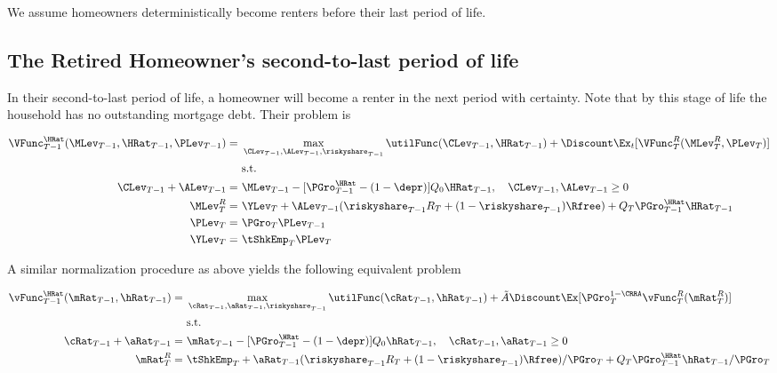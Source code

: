 \documentclass[PortfolioChoiceWithRiskyHousing]{subfiles}
\begin{document}
We assume homeowners deterministically become renters before their last period of life.

\subsection{The Retired Homeowner's second-to-last period of life}

In their second-to-last period of life, a homeowner will become a renter in the next period with certainty. Note that by this stage of life the household has no outstanding mortgage debt. Their problem is

\begin{equation}
	\begin{split}
		\VFunc_{T-1}^{\HRat}(\MLev_{T-1}, \HRat_{T-1}, \PLev_{T-1}) = &~ \max_{\CLev_{T-1}, \ALev_{T-1}, \riskyshare_{T-1}} \utilFunc(\CLev_{T-1}, \HRat_{T-1}) + \Discount \Ex_{t} [\VFunc_{T}^R(\MLev^R_{T}, \PLev_{T})] \\
		&~ \text{s.t.} \\
		\CLev_{T-1} + \ALev_{T-1} = &~ \MLev_{T-1} - [\PGro^{\HRat}_{T-1} - (1-\depr) ]Q_{0} \HRat_{T-1}, \quad \CLev_{T-1} , \ALev_{T-1}\ge 0 \\
		\MLev^R_{T} = &~ \YLev_{T} + \ALev_{T-1}(\riskyshare_{T-1}R_{T} + (1-\riskyshare_{T-1})\Rfree) + Q_{T}\PGro^{\HRat}_{T-1}\HRat_{T-1} \\
		\PLev_{T} = &~ \PGro_{T} \PLev_{T-1} \\
		\YLev_{T} = &~ \tShkEmp_{T}\PLev_{T}
	\end{split}
\end{equation}

A similar normalization procedure as above yields the following equivalent problem

\begin{equation}
	\begin{split}
		\vFunc^{\HRat}_{T-1}(\mRat_{T-1}, \hRat_{T-1}) = &~ \max_{\cRat_{T-1}, \aRat_{T-1}, \riskyshare_{T-1}} \utilFunc(\cRat_{T-1}, \hRat_{T-1}) + \tilde{A} \Discount\Ex[\PGro_{T}^{1-\CRRA}\vFunc^R_{T}(\mRat^R_{T})] \\
		&~ \text{s.t.} \\
		\cRat_{T-1} + \aRat_{T-1} = &~ \mRat_{T-1} -[\PGro^{\HRat}_{T-1} - (1-\depr) ] Q_{0} \hRat_{T-1}, \quad \cRat_{T-1}, \aRat_{T-1} \ge 0 \\
		\mRat_{T}^R = &~ \tShkEmp_{T} + \aRat_{T-1}(\riskyshare_{T-1}R_{T} + (1-\riskyshare_{T-1})\Rfree)/\PGro_{T} + Q_{T}\PGro^{\HRat}_{T-1}\hRat_{T-1}/\PGro_{T}
	\end{split}
\end{equation}
\end{document}
